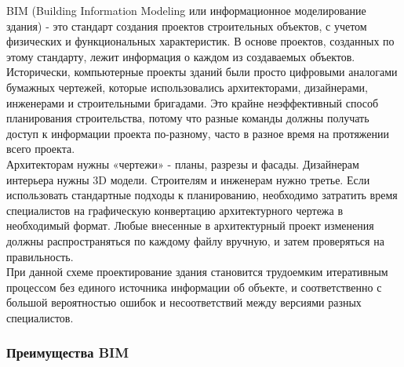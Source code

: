 \documentclass[a4paper,14pt]{extreport} %
\begin{document}
BIM (Building Information Modeling или информационное моделирование здания) - это стандарт создания проектов строительных объектов, с учетом физических и функциональных характеристик. В основе проектов, созданных по этому стандарту, лежит информация о каждом из создаваемых объектов. \\
Исторически, компьютерные проекты зданий были просто цифровыми аналогами бумажных чертежей, которые использовались архитекторами, дизайнерами, инженерами и строительными бригадами. 
Это крайне неэффективный способ планирования строительства, потому что разные команды должны получать доступ к информации проекта по-разному, часто в разное время на протяжении всего проекта. \\
Архитекторам нужны «чертежи» - планы, разрезы и фасады. Дизайнерам интерьера нужны 3D модели. Строителям и инженерам нужно третье. Если использовать стандартные подходы к планированию, необходимо затратить время специалистов на графическую конвертацию архитектурного чертежа в необходимый формат. Любые внесенные в архитектурный проект изменения должны распространяться по каждому файлу вручную, и затем проверяться на правильность. \\
При данной схеме проектирование здания становится трудоемким итеративным процессом без единого источника информации об объекте, и соответственно с большой вероятностью ошибок и несоответствий между версиями разных специалистов.
\subsubsection{Преимущества BIM}
\end{document}
